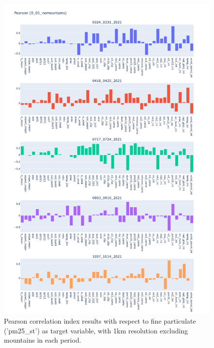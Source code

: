 \begin{figure}[H]
    \centering
    \includegraphics[scale=0.38]{images/tests/0_01_nomountainspm25_st_pearson.png}
    \caption{Pearson correlation index results with respect to fine particulate ('pm25\_st') as target variable, with 1km resolution excluding mountains in each period.}
    
\end{figure}


